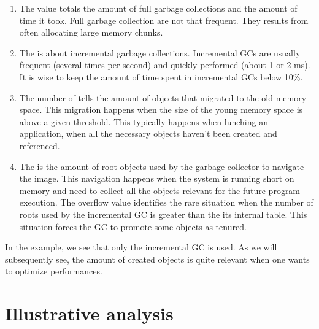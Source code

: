 \documentclass[a4paper,10pt,twoside]{book}
\begin{document}
\begin{enumerate}
\item The  value totals the amount of full garbage collections and the amount of time it took. Full garbage collection are not that frequent. They results from often allocating large memory chunks.

\item The  is about incremental garbage collections. Incremental GCs are usually frequent (several times per second) and quickly performed (about 1 or 2 ms). It is wise to keep the amount of time spent in incremental GCs below 10\%. 


\item The number of  tells the amount of objects that migrated to the old memory space. This migration happens when the size of the young memory space is above a given threshold. This typically happens when lunching an application, when all the necessary objects haven't been created and referenced. 

\item The  is the amount of root objects used by the garbage collector to navigate the image. This navigation happens when the system is running short on memory and need to collect all the objects relevant for the future program execution. The overflow value identifies the rare situation when the number of roots used by the incremental GC is greater than the its internal table. This situation forces the GC to promote some objects as tenured. 


\end{enumerate}

In the example, we see that only the incremental GC is used. As we will subsequently see, the amount of created objects is quite relevant when one wants to optimize performances.

\section{Illustrative analysis}
\end{document}
